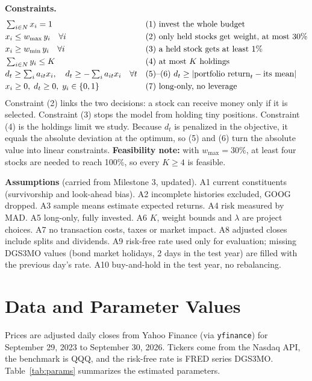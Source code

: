\documentclass[11pt]{article}
\begin{document}
\textbf{Constraints.}
\begin{align}
&\textstyle\sum_{i\in N} x_i = 1 && \text{(1) invest the whole budget}\notag\\
&x_i \le w_{\max}\, y_i \quad \forall i && \text{(2) only held stocks get weight, at most 30\%}\notag\\
&x_i \ge w_{\min}\, y_i \quad \forall i && \text{(3) a held stock gets at least 1\%}\notag\\
&\textstyle\sum_{i\in N} y_i \le K && \text{(4) at most $K$ holdings}\notag\\
&d_t \ge \textstyle\sum_{i} a_{it}x_i,\quad d_t \ge -\textstyle\sum_{i} a_{it}x_i \quad \forall t && \text{(5)--(6) $d_t \ge |\text{portfolio return}_t - \text{its mean}|$}\notag\\
&x_i \ge 0,\; d_t \ge 0,\; y_i\in\{0,1\} && \text{(7) long-only, no leverage}\notag
\end{align}
Constraint (2) links the two decisions: a stock can receive money only if it is selected. Constraint (3) stops the model from holding tiny positions. Constraint (4) is the holdings limit we study. Because $d_t$ is penalized in the objective, it equals the absolute deviation at the optimum, so (5) and (6) turn the absolute value into linear constraints. \textbf{Feasibility note:} with $w_{\max}=30\%$, at least four stocks are needed to reach 100\%, so every $K\ge 4$ is feasible.

\textbf{Assumptions} (carried from Milestone 3, updated). A1 current constituents (survivorship and look-ahead bias). A2 incomplete histories excluded, GOOG dropped. A3 sample means estimate expected returns. A4 risk measured by MAD. A5 long-only, fully invested. A6 $K$, weight bounds and $\lambda$ are project choices. A7 no transaction costs, taxes or market impact. A8 adjusted closes include splits and dividends. A9 risk-free rate used only for evaluation; missing DGS3MO values (bond market holidays, 2 days in the test year) are filled with the previous day's rate. A10 buy-and-hold in the test year, no rebalancing.

\section{Data and Parameter Values}
Prices are adjusted daily closes from Yahoo Finance (via \texttt{yfinance}) for September 29, 2023 to September 30, 2026. Tickers come from the Nasdaq API, the benchmark is QQQ, and the risk-free rate is FRED series DGS3MO. Table~\ref{tab:params} summarizes the estimated parameters.
\end{document}
